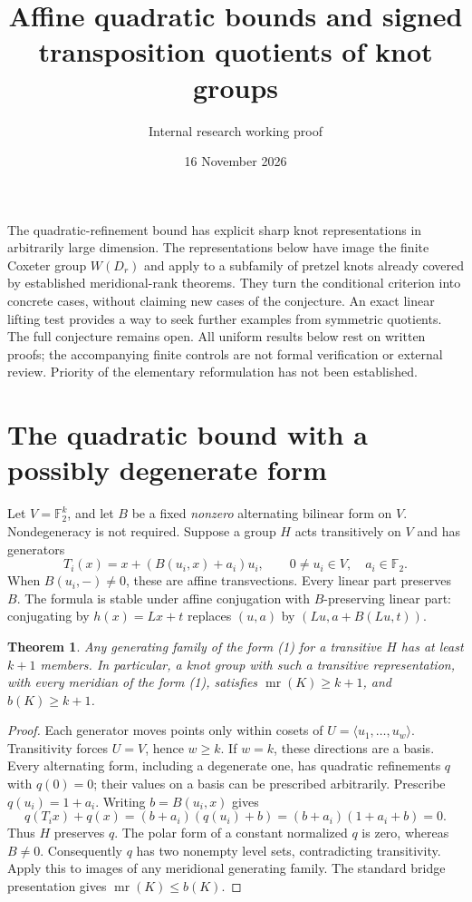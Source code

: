\documentclass[11pt]{article}
\title{Affine quadratic bounds and signed transposition quotients of knot groups}
\author{Internal research working proof}
\date{16 November 2026}
\newtheorem{theorem}{Theorem}
\newcommand{\F}{\mathbb F}
\newcommand{\mr}{\operatorname{mr}}
\begin{document}
\maketitle

The quadratic-refinement bound has explicit sharp knot representations in
arbitrarily large dimension. The representations below have image the finite
Coxeter group $W(D_r)$ and apply to a subfamily of pretzel knots already
covered by established meridional-rank theorems. They turn the conditional
criterion into concrete cases, without claiming new cases of the conjecture.
An exact linear lifting test provides a way to seek further examples from
symmetric quotients. The full conjecture remains open. All uniform results
below rest on written proofs; the accompanying finite controls are not formal
verification or external review. Priority of the elementary reformulation
has not been established.

\section{The quadratic bound with a possibly degenerate form}

Let $V=\F_2^k$, and let $B$ be a fixed \emph{nonzero} alternating bilinear
form on $V$. Nondegeneracy is not required. Suppose a group $H$ acts
transitively on $V$ and has generators
\[
 T_i(x)=x+(B(u_i,x)+a_i)u_i,
 \qquad 0\ne u_i\in V,\quad a_i\in\F_2.                 \tag{1}
\]
When $B(u_i,-)\ne0$, these are affine transvections. Every linear part
preserves $B$. The formula is stable under affine conjugation with
$B$-preserving linear part: conjugating by $h(x)=Lx+t$ replaces
$(u,a)$ by $(Lu,a+B(Lu,t))$.

\begin{theorem}\label{thm:quadratic}
Any generating family of the form (1) for a transitive $H$ has at least
$k+1$ members. In particular, a knot group with such a transitive
representation, with every meridian of the form (1), satisfies
$\mr(K)\ge k+1$, and $b(K)\ge k+1$.
\end{theorem}
\begin{proof}
Each generator moves points only within cosets of
$U=\langle u_1,\ldots,u_w\rangle$. Transitivity forces $U=V$, hence
$w\ge k$. If $w=k$, these directions are a basis. Every alternating form,
including a degenerate one, has quadratic refinements $q$ with $q(0)=0$;
their values on a basis can be prescribed arbitrarily. Prescribe
$q(u_i)=1+a_i$. Writing $b=B(u_i,x)$ gives
\[
 q(T_ix)+q(x)=(b+a_i)(q(u_i)+b)
             =(b+a_i)(1+a_i+b)=0.
\]
Thus $H$ preserves $q$. The polar form of a constant normalized $q$ is zero,
whereas $B\ne0$. Consequently $q$ has two nonempty level sets, contradicting
transitivity. Apply this to images of any meridional generating family.
The standard bridge presentation gives $\mr(K)\le b(K)$.
\end{proof}
\end{document}
